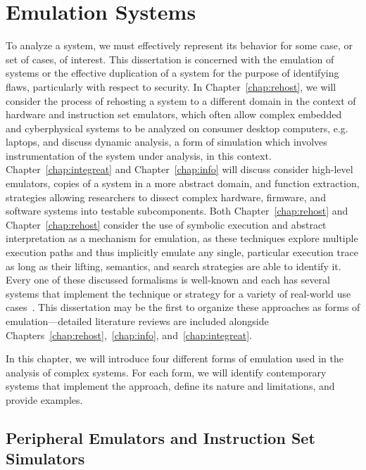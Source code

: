 \chapter{Emulation Systems}
\label{chap:emulation}

To analyze a system, we must effectively represent its behavior for some case, or set of cases, of interest.
This dissertation is concerned with the emulation of systems or the effective duplication of a system for the purpose of identifying flaws, particularly with respect to security.
In Chapter~\ref{chap:rehost}, we will consider the process of rehosting a system to a different domain in the context of hardware and instruction set emulators, which often allow complex embedded and cyberphysical systems to be analyzed on consumer desktop computers, e.g. laptops, and discuss dynamic analysis, a form of simulation which involves instrumentation of the system under analysis, in this context.
Chapter~\ref{chap:integreat} and Chapter~\ref{chap:info} will discuss consider high-level emulators, copies of a system in a more abstract domain, and function extraction, strategies allowing researchers to dissect complex hardware, firmware, and software systems into testable subcomponents.
Both Chapter~\ref{chap:rehost} and Chapter~\ref{chap:rehost} consider the use of symbolic execution and abstract interpretation as a mechanism for emulation, as these techniques explore multiple execution paths and thus implicitly emulate any single, particular execution trace as long as their lifting, semantics, and search strategies are able to identify it.
Every one of these discussed formalisms is well-known and each has several systems that implement the technique or strategy for a variety of real-world use cases~\cite{bellard2005qemu, quynh2015unicorn, deng2013bistro, caballero2009binary, sen2013jalangi, zaddach2014avatar, wang2017angr, cadar2008klee}.
This dissertation may be the first to organize these approaches as forms of emulation---detailed literature reviews are included alongside Chapters~\ref{chap:rehost},\ \ref{chap:info}, and~\ref{chap:integreat}.

In this chapter, we will introduce four different forms of emulation used in the analysis of complex systems.
For each form, we will identify contemporary systems that implement the approach, define its nature and limitations, and provide examples.

\section{Peripheral Emulators and Instruction Set Simulators}
\label{sec:hardemu}

